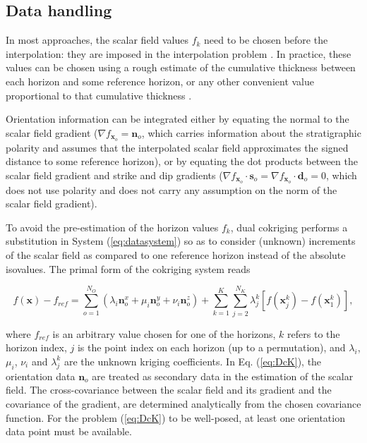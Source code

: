 \documentclass[preprint]{ring20}
\newcommand{\bx}{\mathbf{x}}
\newcommand{\bn}{\mathbf{n}}
\begin{document}
\subsection {Data handling}

In most approaches, the scalar field values $f_k$ need to be chosen before the interpolation: they are imposed in the interpolation problem \citep[e.g., ][]{Frank2007CG,Hillier2014MG,Renaudeau2019MG}. In practice, these values can be chosen using a rough estimate of the cumulative thickness between each horizon and some reference horizon, or any other convenient value proportional to that cumulative thickness \citep{Caumon2013GaRSITo,Collon2016I}. 

Orientation information can be integrated either by equating the normal to the scalar field gradient ($\nabla f_{\bx_o} = \mathbf{n}_o$, which  carries information about the stratigraphic polarity and assumes that the interpolated scalar field approximates the signed distance to some reference horizon), or by equating the dot products between the scalar field gradient and strike and dip gradients ($\nabla f_{\bx_o} \cdot \mathbf{s}_o = \nabla f_{\bx_o} \cdot \mathbf{d}_o = 0$, which does not use polarity and does not carry any assumption on the norm of the scalar field gradient). 

To avoid the pre-estimation of the horizon values $f_k$, dual cokriging \citep[DcK, ][]{Lajaunie1997MG,Chiles04OMSMP} performs a substitution in System (\ref{eq:datasystem}) so as to consider (unknown) increments of the scalar field as compared to one reference horizon instead of the absolute isovalues. The primal form of the cokriging system reads

\begin{equation}
\label{eq:DcK}
f(\bx) - f_{ref} = \sum_{o=1}^{N_O} (\lambda_i \bn_o^x + \mu_i \bn_o^y + \nu_i \bn_o^z) + \sum_{k=1}^{K} \sum_{j=2}^{N_K} \lambda_{j}^{k}[f(\bx_j^k) - f(\bx_1^k)], 
\end{equation}

where $f_{ref}$ is an arbitrary value chosen for one of the horizons, $k$ refers to the horizon index, $j$ is the point index on each horizon (up to a permutation), and $\lambda_i$, $\mu_i$, $\nu_i$ and $\lambda_j^k$ are the unknown kriging coefficients. In Eq. (\ref{eq:DcK}), the orientation data $\bn_o$ are treated as secondary data in the estimation of the scalar field. The cross-covariance between the scalar field and its gradient and the covariance of the gradient, are determined analytically from the chosen covariance function. For the problem (\ref{eq:DcK}) to be well-posed, at least one orientation data point must be available. 
\end{document}
